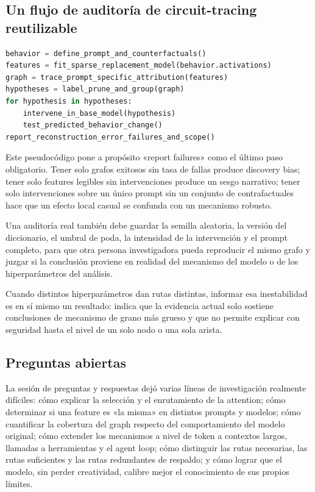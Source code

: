 \documentclass[a4paper]{article}
\begin{document}
\subsection{Un flujo de auditoría de circuit-tracing reutilizable}

\begin{lstlisting}[language=Python,caption={Flujo de auditoría que va de un problema de comportamiento a hipótesis de mecanismo falsables}]
behavior = define_prompt_and_counterfactuals()
features = fit_sparse_replacement_model(behavior.activations)
graph = trace_prompt_specific_attribution(features)
hypotheses = label_prune_and_group(graph)
for hypothesis in hypotheses:
    intervene_in_base_model(hypothesis)
    test_predicted_behavior_change()
report_reconstruction_error_failures_and_scope()
\end{lstlisting}

Este pseudocódigo pone a propósito «report failures» como el último paso obligatorio. Tener solo grafos exitosos sin tasa de fallas produce discovery bias; tener solo features legibles sin intervenciones produce un sesgo narrativo; tener solo intervenciones sobre un único prompt sin un conjunto de contrafactuales hace que un efecto local casual se confunda con un mecanismo robusto.

Una auditoría real también debe guardar la semilla aleatoria, la versión del diccionario, el umbral de poda, la intensidad de la intervención y el prompt completo, para que otra persona investigadora pueda reproducir el mismo grafo y juzgar si la conclusión proviene en realidad del mecanismo del modelo o de los hiperparámetros del análisis.

Cuando distintos hiperparámetros dan rutas distintas, informar esa inestabilidad es en sí mismo un resultado: indica que la evidencia actual solo sostiene conclusiones de mecanismo de grano más grueso y que no permite explicar con seguridad hasta el nivel de un solo nodo o una sola arista.

\subsection{Preguntas abiertas}

La sesión de preguntas y respuestas dejó varias líneas de investigación realmente difíciles: cómo explicar la selección y el enrutamiento de la attention; cómo determinar si una feature es «la misma» en distintos prompts y modelos; cómo cuantificar la cobertura del graph respecto del comportamiento del modelo original; cómo extender los mecanismos a nivel de token a contextos largos, llamadas a herramientas y el agent loop; cómo distinguir las rutas necesarias, las rutas suficientes y las rutas redundantes de respaldo; y cómo lograr que el modelo, sin perder creatividad, calibre mejor el conocimiento de sus propios límites.
\end{document}
